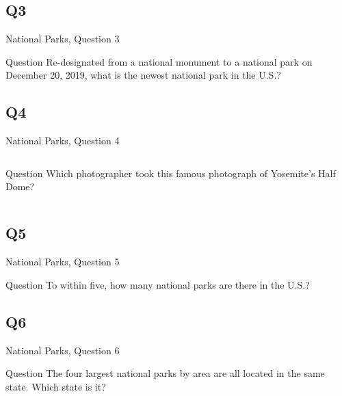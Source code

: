 \documentclass[11pt]{beamer}
\begin{document}
\subsection*{Q3}
\begin{frame}[t]{National Parks, Question 3}
\begin{block}{Question}
Re-designated from a national monument to a national park on December 20, 2019, what is the newest national park in the U.S.?
\end{block}
\end{frame}
\subsection*{Q4}
\begin{frame}[t]{National Parks, Question 4}
\begin{columns}[T,totalwidth=\linewidth]
\begin{column}{0.32\linewidth}
\begin{block}{Question}
Which photographer took this famous photograph of Yosemite's Half Dome?
\end{block}
\end{column}
\begin{column}{0.65\linewidth}
\begin{center}
\texttt{[image: \{Images/halfdome]}.jpeg}
\end{center}
\end{column}
\end{columns}
\end{frame}
\subsection*{Q5}
\begin{frame}[t]{National Parks, Question 5}
\begin{block}{Question}
To within five, how many national parks are there in the U.S.?
\end{block}
\end{frame}
\subsection*{Q6}
\begin{frame}[t]{National Parks, Question 6}
\begin{block}{Question}
The four largest national parks by area are all located in the same state. Which state is it?
\end{block}
\end{frame}
\end{document}
